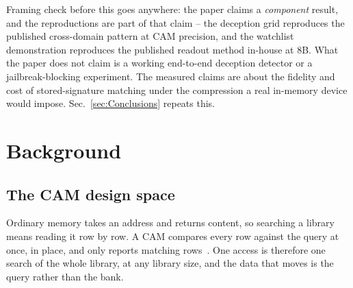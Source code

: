 \documentclass[conference]{IEEEtran}
\newcommand{\cam}{{CAM}\xspace}
\begin{document}
\begin{pnote}
Framing check before this goes anywhere: the paper claims a
\emph{component} result, and the reproductions are part of that claim
-- the deception grid reproduces the published cross-domain pattern at
\cam precision, and the watchlist demonstration reproduces the
published readout method in-house at 8B. What the paper does not claim
is a working end-to-end deception detector or a jailbreak-blocking
experiment. The measured claims are about the fidelity and cost of
stored-signature matching under the compression a real in-memory
device would impose. Sec.~\ref{sec:Conclusions} repeats this.
\end{pnote}

\section{Background}
\label{sec:Background}

\subsection{The CAM design space}
\label{subsec:CAMspace}
Ordinary memory takes an address and returns content, so searching a
library means reading it row by row. A \cam compares every row
against the query at once, in place, and only reports matching
rows~\cite{pagiamtzis2006cam}. One access is therefore one search of
the whole library, at any library size, and the data that moves is the
query rather than the bank.
\end{document}
